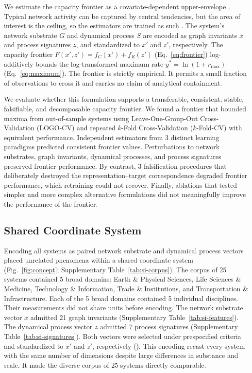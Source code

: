 \documentclass{article}
\begin{document}
We estimate the capacity frontier as a covariate-dependent upper-envelope \citep{ref103,ref111}. Typical network activity can be captured by central tendencies, but the area of interest is the ceiling, so the estimators are trained as such \citep{ref19,ref20,ref21,ref22,ref23,ref31,ref29}. The system's network substrate $G$ and dynamical process $S$ are encoded as graph invariants $x$ and process signatures $z$, and standardized to $x'$ and $z'$, respectively. The capacity frontier $F(x', z') = f_C(x') + f_R(z')$ (Eq.~\eqref{eq:frontier}) log-additively bounds the log-transformed maximum rate $y^* = \ln(1 + r_{\max})$ (Eq.~\eqref{eq:maximum}). The frontier is strictly empirical. It permits a small fraction of observations to cross it and carries no claim of analytical containment.

We evaluate whether this formulation supports a transferable, consistent, stable, falsifiable, and decomposable capacity frontier. We found a frontier that bounded maxima from out-of-sample systems using Leave-One-Group-Out Cross-Validation (LOGO-CV) and repeated $k$-Fold Cross-Validation ($k$-Fold-CV) with equivalent performance. Independent estimators from 3 distinct learning paradigms predicted consistent frontier values. Perturbations to network substrates, graph invariants, dynamical processes, and process signatures preserved frontier performance. By contrast, 3 falsification procedures that deliberately destroyed the representation–target correspondence degraded frontier performance, which retraining could not recover. Finally, ablations that tested simpler and more complex alternative formulations did not meaningfully improve the performance of the frontier.

\label{sec:results}

\subsection*{Shared Coordinate System}
\label{sub-sec:shared}
Encoding all systems as paired network substrate and dynamical process vectors placed unrelated phenomena within a shared coordinate system (Fig.~\ref{fig:concept}; Supplementary Table~\ref{tab:si-corpus}). The corpus of 25 systems contained 5 broad domains: Earth \& Physical Sciences, Life Sciences \& Medicine, Technology \& Information, Trade \& Institutions, and Transportation \& Infrastructure. Each of the 5 broad domains contained 5 individual disciplines. Their measurements did not share units before encoding. The network substrate vector $x$ admitted 21 graph invariants (Supplementary Table~\ref{tab:si-features}). The dynamical process vector $z$ admitted 7 process signatures (Supplementary Table~\ref{tab:si-signatures}). Both vectors were selected under prespecified criteria and standardized to $x'$ and $z'$, respectively (). This encoding recast every system with the same number of dimensions despite large differences in substance and scale. It made the diverse corpus of 25 systems directly comparable.
\end{document}
